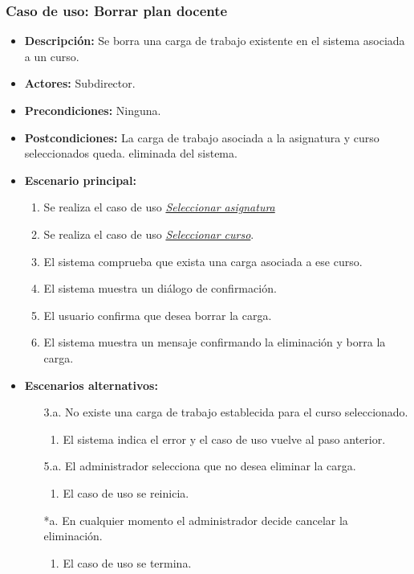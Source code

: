 \documentclass{book}
\begin{document}
\subsubsection*{Caso de uso: Borrar plan docente}
\begin{itemize}
\item{\bf Descripción:} Se borra una carga de trabajo existente en el sistema asociada a un curso.
\item{\bf Actores:} Subdirector.
\item{\bf Precondiciones:} Ninguna.
\item{\bf Postcondiciones:} La carga de trabajo asociada a la asignatura y curso seleccionados queda. eliminada del sistema.
\item{\bf Escenario principal:}
	\begin{enumerate}
	\item Se realiza el caso de uso {\em \hyperref[select_asignatura]{Seleccionar asignatura}}
	\item Se realiza el caso de uso {\em \hyperref[select_curso]{Seleccionar curso}}.
	\item El sistema comprueba que exista una carga asociada a ese curso.
	\item El sistema muestra un diálogo de confirmación.
	\item El usuario confirma que desea borrar la carga.
	\item El sistema muestra un mensaje confirmando la eliminación y borra la carga.
	\end{enumerate}
\item{\bf Escenarios alternativos:}
	\begin{itemize}
	\item[3.a.] No existe una carga de trabajo establecida para el curso seleccionado.
	  \begin{enumerate}
	  \item El sistema indica el error y el caso de uso vuelve al paso anterior.
	  \end{enumerate}
	\item[5.a.] El administrador selecciona que no desea eliminar la carga.
		\begin{enumerate}
		\item El caso de uso se reinicia.
		\end{enumerate}
	\item[*a.] En cualquier momento el administrador decide cancelar la eliminación.
		\begin{enumerate}
		\item El caso de uso se termina.
		\end{enumerate}
	\end{itemize}
\end{itemize}
\end{document}
